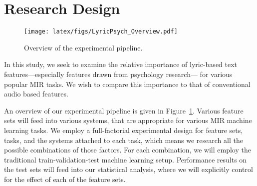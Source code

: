 \documentclass{article}
\begin{document}
\section{Research Design}\label{sec:resdes}

\begin{figure}[!tb]
    \centering
    \texttt{[image: latex/figs/LyricPsych\_Overview.pdf]}
    \caption{Overview of the experimental pipeline.}
    \label{fig:experimental_pipeline}
\end{figure}

In this study, we seek to examine the relative importance of lyric-based text features---especially features drawn from psychology research--- for various popular MIR tasks. We wish to compare this importance to that of conventional audio based features.

An overview of our experimental pipeline is given in Figure~\ref{fig:experimental_pipeline}. Various feature sets will feed into various systems, that are appropriate for various MIR machine learning tasks. We employ a full-factorial experimental design for feature sets, tasks, and the systems attached to each task, which means we research all the possible combinations of those factors. For each combination, we will employ the traditional train-validation-test machine learning setup. Performance results on the test sets will feed into our statistical analysis, where we will explicitly control for the effect of each of the feature sets.


\end{document}
